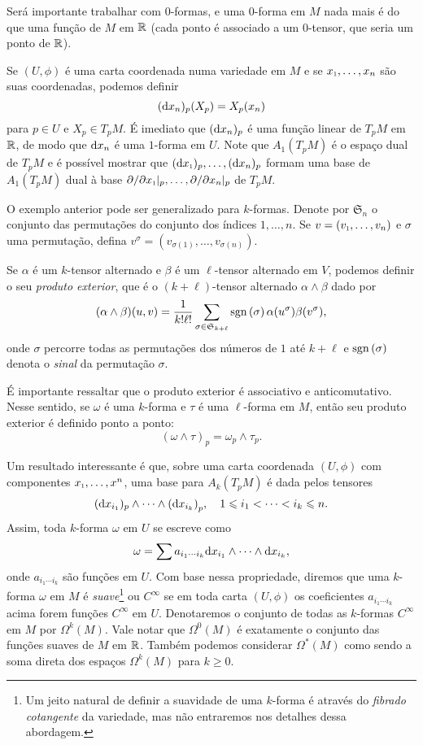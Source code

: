 Será importante trabalhar com $0$-formas, e uma $0$-forma em $M$ nada mais é do que uma função de $M$ em $\operatorname{\mathbb{R}}$ (cada ponto é associado a um $0$-tensor, que seria um ponto de $\operatorname{\mathbb{R}}$).

\begin{exemplo} 
	Se $(U,\phi)$ é uma carta coordenada numa variedade em $M$ e se $\sub x1,\dots,x_n$ são suas coordenadas, podemos definir
	\[
	({\operatorname{d}}{x_n})_p(X_p) = X_p(x_n)
	\]
	para $p \in U$ e $X_p \in T_pM$. É imediato que $({\operatorname{d}}{x_n})_p$ é uma função linear de $T_pM$ em $\operatorname{\mathbb{R}}$, de modo que ${\operatorname{d}}{x_n}$ é uma $1$-forma em $U$. Note que $A_1(T_pM)$ é o espaço dual de $T_pM$ e é possível mostrar que $(\de{\sub x1})_p, \ldots, (\de{x_n})_p$ formam uma base de $A_1(T_pM)$ dual à base $\partial/\partial \sub x1|_p, \ldots ,\partial/\partial x_n|_p$ de $T_pM$.
\end{exemplo}

O exemplo anterior pode ser generalizado para $k$-formas. Denote por $\mathfrak S_n$ o conjunto das permutações do conjunto dos índices $1,\ldots,n$. Se $v=(\sub v1,\ldots,v_n)$ e $\sigma$ uma permutação, defina $v^\sigma = (v_{\sigma(1)},\ldots, v_{\sigma(n)})$. 

\begin{definicao}
	Se $\alpha$ é um $k$-tensor alternado e $\beta$ é um $\ell$-tensor alternado em $V$, podemos definir o seu \textit{produto exterior}, que é o $(k+\ell)$-tensor alternado $\alpha \wedge \beta$ dado por
	\[
	(\alpha \wedge \beta)(u,v) = \frac{1}{k!\ell!}\sum_{\sigma \in \mathfrak S_{k+\ell}} \operatorname{sgn}\left({\sigma}\right)\alpha(u^\sigma)\beta(v^\sigma),
	\]
	onde $\sigma$ percorre todas as permutações dos números de $1$ até $k+\ell$ e $\operatorname{sgn}\left({\sigma}\right)$ denota o \textit{sinal} da permutação $\sigma$.
\end{definicao}

É importante ressaltar que o produto exterior é associativo e anticomutativo. Nesse sentido, se $\omega$ é uma $k$-forma e $\tau$ é uma $\ell$-forma em $M$, então seu produto exterior é definido ponto a ponto:
\[
(\omega \wedge \tau)_p = \omega_p \wedge \tau_p.
\]

Um resultado interessante é que, sobre uma carta coordenada $(U,\phi)$ com componentes $\sub x1,\dots,x^n$, uma base para $A_k(T_pM)$ é dada pelos tensores
\[
({\operatorname{d}}{x_{i_1}})_p \wedge \dotsb \wedge ({\operatorname{d}}{x_{i_k})}_p, \quad 1 \leqslant i_1 < \dotsb < i_k \leqslant n.
\]
Assim, toda $k$-forma $\omega$ em $U$ se escreve como
\[
\omega = \sum a_{i_1 \dotsb i_k} {\operatorname{d}}{x_{i_1}} \wedge \dotsb \wedge {\operatorname{d}}{x_{i_k}},
\]
onde $a_{i_1 \dotsb i_k}$ são funções em $U$. Com base nessa propriedade, diremos que uma $k$-forma $\omega$ em $M$ é \textit{suave}\footnote{Um jeito natural de definir a suavidade de uma $k$-forma é através do \textit{fibrado cotangente} da variedade, mas não entraremos nos detalhes dessa abordagem.} ou $C^{\infty}$ se em toda carta $(U, \phi)$ os coeficientes $a_{i_1 \dotsb i_k}$ acima forem funções $C^{\infty}$ em $U$. Denotaremos o conjunto de todas as $k$-formas $C^{\infty}$ em $M$ por $\Omega^k(M)$. Vale notar que $\Omega^0(M)$ é exatamente o conjunto das funções suaves de $M$ em $\operatorname{\mathbb{R}}$. Também podemos considerar $\Omega^*(M)$ como sendo a soma direta dos espaços $\Omega^k(M)$ para $k \geq 0$.


